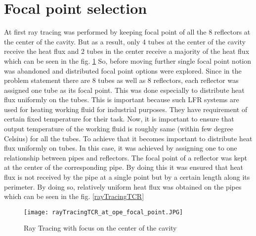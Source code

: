 \section{Focal point selection}
At first ray tracing was performed by keeping focal point of all the 8 reflectors at the center of the cavity. But as a result, only 4 tubes at the center of the cavity receive the heat flux and 2 tubes in the center receive a majority of the heat flux which can be seen in the fig. \ref{rayTracingTCR_at_ope_focal_point}  So, before moving further single focal point notion was abandoned and distributed focal point options were explored. Since in the problem statement there are 8 tubes as well as 8 reflectors, each reflector was assigned one tube as its focal point. This was done especially to distribute heat flux uniformly on the tubes. This is important because such LFR systems are used for heating working fluid for industrial purposes. They have requirement of certain fixed temperature for their task. Now, it is important to ensure that output temperature of the working fluid is roughly same (within few degree Celsius) for all the tubes. To achieve that it becomes important to distribute heat flux uniformly on tubes. In this case, it was achieved by assigning one to one relationship between pipes and reflectors. The focal point of a reflector was kept at the center of the corresponding pipe. By doing this it was ensured that heat flux is not received by the pipe at a single point but by a certain length along its perimeter. By doing so, relatively uniform heat flux was obtained on the pipes which can be seen in the fig. \ref{rayTracingTCR}

\begin{figure}[H]
\begin{center}
  \texttt{[image: rayTracingTCR\_at\_ope\_focal\_point.JPG]}
\caption{Ray Tracing with focus on the center of the cavity}
\end{center}
\label{rayTracingTCR_at_ope_focal_point}
\end{figure}


